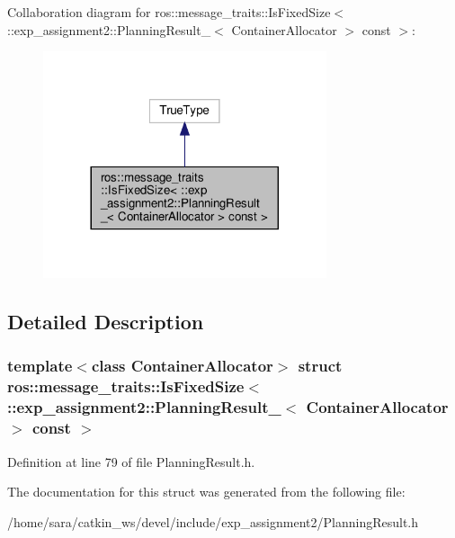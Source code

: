 Collaboration diagram for ros\+:\+:message\+\_\+traits\+:\+:Is\+Fixed\+Size$<$ \+:\+:exp\+\_\+assignment2\+:\+:Planning\+Result\+\_\+$<$ Container\+Allocator $>$ const $>$\+:
\nopagebreak
\begin{figure}[H]
\begin{center}
\leavevmode
\includegraphics[width=236pt]{structros_1_1message__traits_1_1IsFixedSize_3_01_1_1exp__assignment2_1_1PlanningResult___3_01Con98519ddd53d7e6992bb661c2662cad2e}
\end{center}
\end{figure}


\subsection{Detailed Description}
\subsubsection*{template$<$class Container\+Allocator$>$\newline
struct ros\+::message\+\_\+traits\+::\+Is\+Fixed\+Size$<$ \+::exp\+\_\+assignment2\+::\+Planning\+Result\+\_\+$<$ Container\+Allocator $>$ const $>$}



Definition at line 79 of file Planning\+Result.\+h.



The documentation for this struct was generated from the following file\+:\begin{DoxyCompactItemize}
\item 
/home/sara/catkin\+\_\+ws/devel/include/exp\+\_\+assignment2/Planning\+Result.\+h\end{DoxyCompactItemize}

